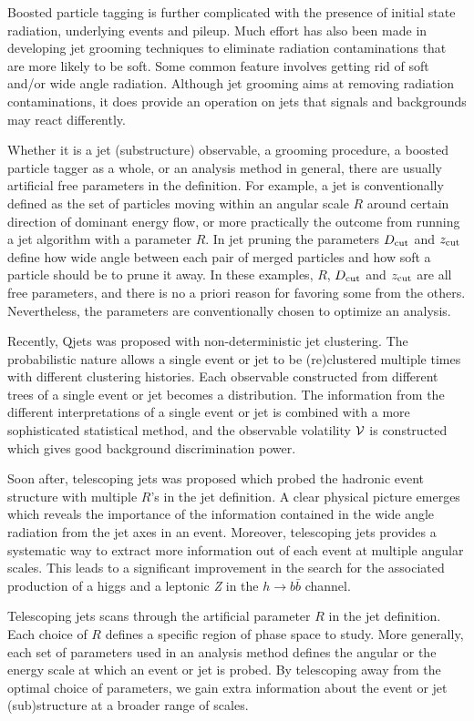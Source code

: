 \documentclass[aps,prl,floatfix,twocolumn,footinbib,amsmath,amssymb]{revtex4}
\begin{document}
Boosted particle tagging is further complicated with the presence of initial state radiation, underlying events and pileup. Much effort has also been made in developing jet grooming techniques to eliminate radiation contaminations that are more likely to be soft. Some common feature involves getting rid of soft and/or wide angle radiation. Although jet grooming aims at removing radiation contaminations, it does provide an operation on jets that signals and backgrounds may react differently.

Whether it is a jet (substructure) observable, a grooming procedure, a boosted particle tagger as a whole, or an analysis method in general, there are usually artificial free parameters in the definition. For example, a jet is conventionally defined as the set of particles moving within an angular scale $R$ around certain direction of dominant energy flow, or more practically the outcome from running a jet algorithm with a parameter $R$. In jet pruning the parameters $D_{\rm cut}$ and $z_{\rm cut}$ define how wide angle between each pair of merged particles and how soft a particle should be to prune it away. In these examples, $R$, $D_{\rm cut}$ and $z_{\rm cut}$ are all free parameters, and there is no a priori reason for favoring some from the others. Nevertheless, the parameters are conventionally chosen to optimize an analysis.

Recently, Qjets was proposed with non-deterministic jet clustering. The probabilistic nature allows a single event or jet to be (re)clustered multiple times with different clustering histories. Each observable constructed from different trees of a single event or jet becomes a distribution. The information from the different interpretations of a single event or jet is combined with a more sophisticated statistical method, and the observable volatility ${\cal V}$ is constructed which gives good background discrimination power.

Soon after, telescoping jets was proposed which probed the hadronic event structure with multiple $R$'s in the jet definition. A clear physical picture emerges which reveals the importance of the information contained in the wide angle radiation from the jet axes in an event. Moreover, telescoping jets provides a systematic way to extract more information out of each event at multiple angular scales. This leads to a significant improvement in the search for the associated production of a higgs and a leptonic {\sl Z} in the $h\rightarrow b \bar b$ channel.

Telescoping jets scans through the artificial parameter $R$ in the jet definition. Each choice of $R$ defines a specific region of phase space to study. More generally, each set of parameters used in an analysis method defines the angular or the energy scale at which an event or jet is probed. By telescoping away from the optimal choice of parameters, we gain extra information about the event or jet (sub)structure at a broader range of scales.
\end{document}
